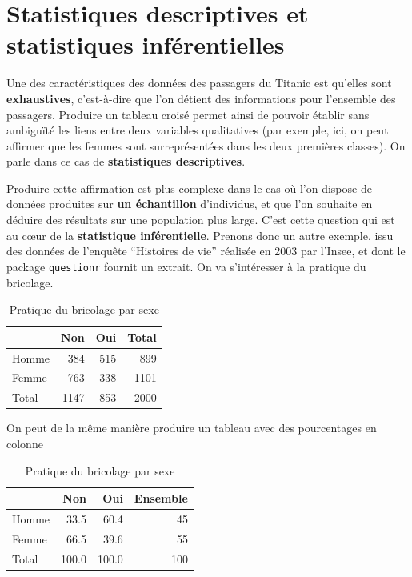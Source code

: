 \documentclass[
]{book}
\begin{document}
\hypertarget{statistiques-descriptives-et-statistiques-infuxe9rentielles}{%
\section{Statistiques descriptives et statistiques inférentielles}\label{statistiques-descriptives-et-statistiques-infuxe9rentielles}}

Une des caractéristiques des données des passagers du Titanic est qu'elles sont \textbf{exhaustives}, c'est-à-dire que l'on détient des informations pour l'ensemble des passagers. Produire un tableau croisé permet ainsi de pouvoir établir sans ambiguïté les liens entre deux variables qualitatives (par exemple, ici, on peut affirmer que les femmes sont surreprésentées dans les deux premières classes). On parle dans ce cas de \textbf{statistiques descriptives}.

Produire cette affirmation est plus complexe dans le cas où l'on dispose de données produites sur \textbf{un échantillon} d'individus, et que l'on souhaite en déduire des résultats sur une population plus large. C'est cette question qui est au cœur de la \textbf{statistique inférentielle}. Prenons donc un autre exemple, issu des données de l'enquête ``Histoires de vie'' réalisée en 2003 par l'Insee, et dont le package \texttt{questionr} fournit un extrait. On va s'intéresser à la pratique du bricolage.

\begin{table}

\caption{\label{tab:unnamed-chunk-21}Pratique du bricolage par sexe}
\centering
\begin{tabular}[t]{l|r|r|r}
\hline
  & Non & Oui & Total\\
\hline
Homme & 384 & 515 & 899\\
\hline
Femme & 763 & 338 & 1101\\
\hline
Total & 1147 & 853 & 2000\\
\hline
\end{tabular}
\end{table}

On peut de la même manière produire un tableau avec des pourcentages en colonne

\begin{table}

\caption{\label{tab:unnamed-chunk-22}Pratique du bricolage par sexe}
\centering
\begin{tabular}[t]{l|r|r|r}
\hline
  & Non & Oui & Ensemble\\
\hline
Homme & 33.5 & 60.4 & 45\\
\hline
Femme & 66.5 & 39.6 & 55\\
\hline
Total & 100.0 & 100.0 & 100\\
\hline
\end{tabular}
\end{table}
\end{document}
